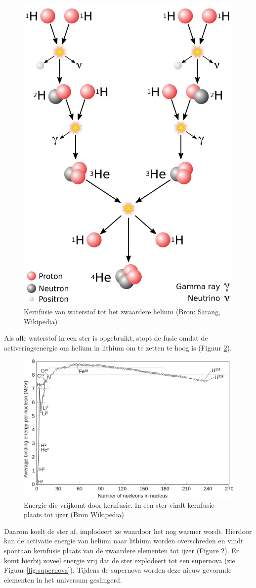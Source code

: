 \documentclass[
  11pt,
]{book}
\begin{document}
\begin{figure}

{\centering \includegraphics[width=0.5\linewidth]{./figs/fusion} 

}

\caption{Kernfusie van waterstof tot het zwaardere helium (Bron: Sarang, Wikipedia)}\label{fig:nuclearFusion}
\end{figure}

Als alle waterstof in een ster is opgebruikt, stopt de fusie omdat de activeringsenergie om helium in lithium om te zetten te hoog is (Figuur \ref{fig:fusionEnergy}).

\begin{figure}

{\centering \includegraphics[width=0.5\linewidth]{./figs/fusionEnergy} 

}

\caption{Energie die vrijkomt door kernfusie. In een ster vindt kernfusie plaats tot ijzer (Bron Wikipedia)}\label{fig:fusionEnergy}
\end{figure}

Daarom koelt de ster af, implodeert ze waardoor het nog warmer wordt. Hierdoor kan de activatie energie van helium naar lithium worden overschreden en vindt spontaan kernfusie plaats van de zwaardere elementen tot ijzer (Figure \ref{fig:fusionEnergy}). Er komt hierbij zoveel energie vrij dat de ster explodeert tot een supernova (zie Figuur \ref{fig:supernova}). Tijdens de supernova worden deze nieuw gevormde elementen in het universum geslingerd.
\end{document}

